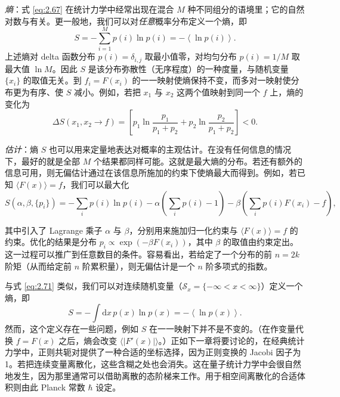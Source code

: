 \emph{熵}：式 \eqref{eq:2.67} 在统计力学中经常出现在混合 $M$ 种不同组分的语境里；它的自然对数与有关。更一般地，我们可以对\emph{任意}概率分布定义一个熵，即
\begin{equation}\label{eq:2.71}
  S=-\sum_{i=1}^{M}p(i)\ln p(i)=-\left\langle\ln p(i)\right\rangle.
\end{equation}
上述熵对 delta 函数分布 $p(i)=\delta_{i,j}$ 取最小值零，对均匀分布 $p(i)=1/M$ 取最大值 $\ln M$。因此 $S$ 是该分布弥散性（无序程度）的一种度量，与随机变量 $\{x_i\}$ 的取值无关。到 $f_i=F(x_i)$ 的一一映射使熵保持不变，而多对一映射使分布更为有序、使 $S$ 减小。例如，若把 $x_1$ 与 $x_2$ 这两个值映射到同一个 $f$ 上，熵的变化为
\begin{equation}\label{eq:2.72}
  \Delta S(x_1,x_2\to f)=\left[p_1\ln\frac{p_1}{p_1+p_2}+p_2\ln\frac{p_2}{p_1+p_2}\right]<0.
\end{equation}

\emph{估计}：熵 $S$ 也可以用来定量地表达对概率的主观估计。在没有任何信息的情况下，最好的就是全部 $M$ 个结果都同样可能。这就是最大熵的分布。若还有额外的信息可用，则无偏估计通过在该信息所施加的约束下使熵最大而得到。例如，若已知 $\langle F(x)\rangle=f$，我们可以最大化
\begin{equation}\label{eq:2.73}
  S\left(\alpha,\beta,\{p_i\}\right)=-\sum_i p(i)\ln p(i)-\alpha\left(\sum_i p(i)-1\right)-\beta\left(\sum_i p(i)F(x_i)-f\right),
\end{equation}

其中引入了 Lagrange 乘子 $\alpha$ 与 $\beta$，分别用来施加归一化约束与 $\langle F(x)\rangle=f$ 的约束。优化的结果是分布 $p_i\propto\exp(-\beta F(x_i))$，其中 $\beta$ 的取值由约束定出。这一过程可以推广到任意数目的条件。容易看出，若给定了一个分布的前 $n=2k$ 阶矩（从而给定前 $n$ 阶累积量），则无偏估计是一个 $n$ 阶多项式的指数。

与式 \eqref{eq:2.71} 类似，我们可以对连续随机变量（$\mathscr{S}_x=\{-\infty<x<\infty\}$）定义一个熵，即
\begin{equation}\label{eq:2.74}
  S=-\int\mathrm{d}x\,p(x)\ln p(x)=-\left\langle\ln p(x)\right\rangle.
\end{equation}
然而，这个定义存在一些问题，例如 $S$ 在一一映射下并不是不变的。（在作变量代换 $f=F(x)$ 之后，熵会改变 $\langle|F'(x)|\rangle$。）正如下一章将要讨论的，在经典统计力学中，正则共轭对提供了一种合适的坐标选择，因为正则变换的 Jacobi 因子为 1。若把连续变量离散化，这些含糊之处也会消失。这在量子统计力学中会很自然地发生，因为那里通常可以借助离散的态阶梯来工作。用于相空间离散化的合适体积则由此 Planck 常数 $\hbar$ 设定。

